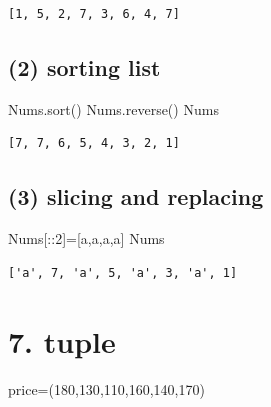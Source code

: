 \documentclass[
  letterpaper,
  DIV=11,
  numbers=noendperiod]{scrreprt}
\newenvironment{Shaded}{\begin{snugshade}}{\end{snugshade}}
\newcommand{\DecValTok}[1]{\textcolor[rgb]{0.68,0.00,0.00}{#1}}
\newcommand{\NormalTok}[1]{\textcolor[rgb]{0.00,0.23,0.31}{#1}}
\newcommand{\OperatorTok}[1]{\textcolor[rgb]{0.37,0.37,0.37}{#1}}
\newcommand{\StringTok}[1]{\textcolor[rgb]{0.13,0.47,0.30}{#1}}
\begin{document}
\begin{verbatim}
[1, 5, 2, 7, 3, 6, 4, 7]
\end{verbatim}

\subsection*{(2) sorting list}\label{sorting-list}

\begin{Shaded}
\begin{Highlighting}[]
\NormalTok{Nums.sort()}
\NormalTok{Nums.reverse()}
\NormalTok{Nums}
\end{Highlighting}
\end{Shaded}

\begin{verbatim}
[7, 7, 6, 5, 4, 3, 2, 1]
\end{verbatim}

\subsection*{(3) slicing and replacing}\label{slicing-and-replacing}

\begin{Shaded}
\begin{Highlighting}[]
\NormalTok{Nums[::}\DecValTok{2}\NormalTok{]}\OperatorTok{=}\NormalTok{[}\StringTok{\textquotesingle{}a\textquotesingle{}}\NormalTok{,}\StringTok{\textquotesingle{}a\textquotesingle{}}\NormalTok{,}\StringTok{\textquotesingle{}a\textquotesingle{}}\NormalTok{,}\StringTok{\textquotesingle{}a\textquotesingle{}}\NormalTok{]}
\NormalTok{Nums}
\end{Highlighting}
\end{Shaded}

\begin{verbatim}
['a', 7, 'a', 5, 'a', 3, 'a', 1]
\end{verbatim}

\section*{7. tuple}\label{tuple}


\begin{Shaded}
\begin{Highlighting}[]
\NormalTok{price}\OperatorTok{=}\NormalTok{(}\DecValTok{180}\NormalTok{,}\DecValTok{130}\NormalTok{,}\DecValTok{110}\NormalTok{,}\DecValTok{160}\NormalTok{,}\DecValTok{140}\NormalTok{,}\DecValTok{170}\NormalTok{)}
\end{Highlighting}
\end{Shaded}
\end{document}
